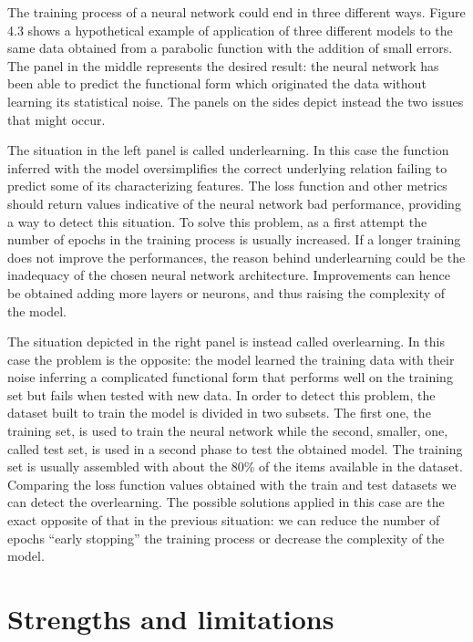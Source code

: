 \documentclass[a4paper,10pt]{report}
\begin{document}
The training process of a neural network could end in three different ways.
Figure 4.3 shows a hypothetical example of application of three different models to the same data obtained 
from a parabolic function with the addition of small errors.
The panel in the middle represents the desired result: the neural network has been able to predict the 
functional form which originated the data without learning its statistical noise.
The panels on the sides depict instead the two issues that might occur.

The situation in the left panel is called underlearning. In this case the 
function inferred with the model oversimplifies the correct underlying relation failing 
to predict some of its characterizing features. The loss function and other metrics
should return values indicative of the neural network bad performance, providing
a way to detect this situation.
To solve this problem, as a first attempt the number of epochs in the training process is
usually increased. If a longer training does not improve the performances, the reason behind
underlearning could be the inadequacy of the chosen neural network architecture. 
Improvements can hence be obtained adding more layers or neurons, and thus raising the complexity of the model.

The situation depicted in the right panel is instead called overlearning.
In this case the problem is the opposite: the model learned the training data
with their noise inferring a complicated functional form that performs
well on the training set but fails when tested with new data. In order to detect this problem,
the dataset built to train the model is divided in two subsets. The first one, the training set, is used to
train the neural network while the second, smaller, one, called test set, is used in a second phase to
test the obtained model. The training set is usually assembled with about the 80\% of the items available in the dataset.
Comparing the loss function values obtained with the train and test datasets we can
detect the overlearning. 
The possible solutions applied in this case are the exact opposite of that in the previous situation:
we can reduce the number of epochs ``early stopping'' the training process or decrease the complexity of
the model.

\section{Strengths and limitations}

\end{document}
